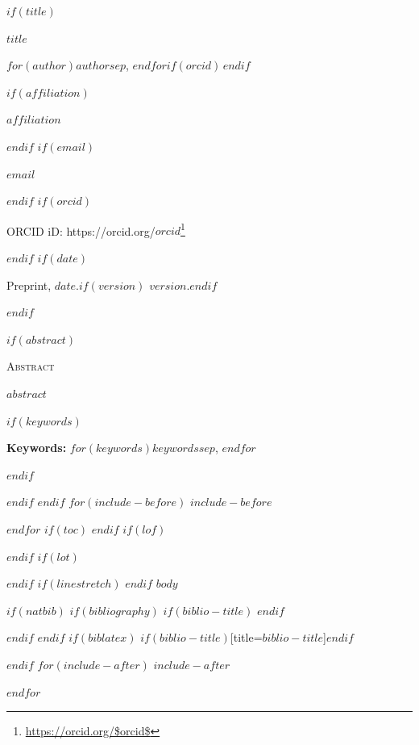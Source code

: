 \documentclass[10pt,a4paper$for(classoption)$,$classoption$$endfor$]{article}
\DeclareRobustCommand{\href}[2]{#2\footnote{\url{#1}}}
\begin{document}
$if(title)$
\begin{center}
{\LARGE\bfseries $title$\par}
\vspace{10pt}
{\large $for(author)$$author$$sep$, $endfor$$if(orcid)$\,$endif$\par}
$if(affiliation)$
\vspace{3pt}
{\itshape $affiliation$\par}
$endif$
$if(email)$
\vspace{2pt}
{\texttt{$email$}\par}
$endif$
$if(orcid)$
\vspace{2pt}
{\small ORCID iD: \href{https://orcid.org/$orcid$}{https://orcid.org/$orcid$}\par}
$endif$
$if(date)$
\vspace{6pt}
{\small Preprint, $date$.$if(version)$ $version$.$endif$\par}
$endif$
\end{center}
$if(abstract)$
\vspace{8pt}
\begin{center}
\begin{minipage}{0.9\textwidth}
\begin{center}{\scshape Abstract}\end{center}
\vspace{2pt}
{\fontsize{9.5}{11.8}\selectfont\noindent $abstract$\par}
$if(keywords)$
\vspace{7pt}
{\fontsize{9.5}{11.8}\selectfont\noindent\textbf{Keywords:} $for(keywords)$$keywords$$sep$, $endfor$\par}
$endif$
\end{minipage}
\end{center}
\vspace{10pt}
$endif$
$endif$
$for(include-before)$
$include-before$

$endfor$
$if(toc)$
{
\hypersetup{linkcolor=$if(toccolor)$$toccolor$$else$linkblue$endif$}
\setcounter{tocdepth}{$toc-depth$}
\tableofcontents
}
$endif$
$if(lof)$
\listoffigures
$endif$
$if(lot)$
\listoftables
$endif$
$if(linestretch)$
$endif$
$body$

$if(natbib)$
$if(bibliography)$
$if(biblio-title)$
\renewcommand\refname{$biblio-title$}
$endif$
  

$endif$
$endif$
$if(biblatex)$
\printbibliography$if(biblio-title)$[title=$biblio-title$]$endif$

$endif$
$for(include-after)$
$include-after$

$endfor$
\end{document}
